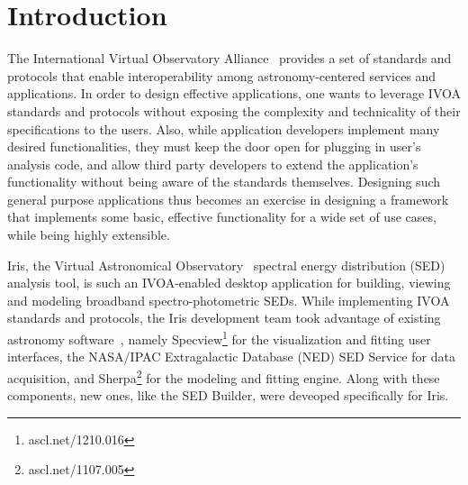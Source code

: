 \documentclass[final,5p]{elsarticle}
\begin{document}
\section{Introduction}
The International Virtual Observatory Alliance~\citep[IVOA;][]{2004SPIE.5493..137Q} provides a set of standards and protocols that enable interoperability among astronomy-centered services and applications. In order to design effective applications, one wants to leverage IVOA standards and protocols without exposing the complexity and technicality of their specifications to the users. Also, while application developers implement many desired functionalities, they must keep the door open for plugging in user's analysis code, and allow third party developers to extend the application's functionality without being aware of the standards themselves. Designing such general purpose applications thus becomes an exercise in designing a framework that implements some basic, effective functionality for a wide set of use cases, while being highly extensible.


Iris, the Virtual Astronomical Observatory~\citep[VAO;][]{2012SPIE.8449E..0HB} spectral energy distribution (SED) analysis tool, is such an IVOA-enabled desktop application for building, viewing and modeling broadband spectro-photometric SEDs. While implementing IVOA standards and protocols, the Iris development team took advantage of existing astronomy software~\citep{2012ASPC..461..893D,2013AAS...22124038L}, namely Specview\footnote{ascl.net/1210.016} for the visualization and fitting user interfaces, the NASA/IPAC Extragalactic Database (NED) SED Service for data acquisition, and Sherpa\footnote{ascl.net/1107.005} for the modeling and fitting engine. Along with these components, new ones, like the SED Builder, were deveoped specifically for Iris. 

\end{document}
